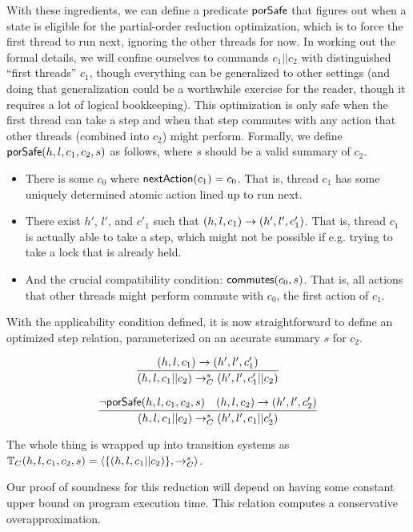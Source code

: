 \documentclass{amsbook}
\theoremstyle{definition}
\theoremstyle{remark}
\numberwithin{section}{chapter}
\numberwithin{equation}{chapter}
\begin{document}
With these ingredients, we can define a predicate $\mathsf{porSafe}$ that figures out when a state is eligible for the partial-order reduction optimization, which is to force the first thread to run next, ignoring the other threads for now.
In working out the formal details, we will confine ourselves to commands $c_1 || c_2$ with distinguished ``first threads'' $c_1$, though everything can be generalized to other settings (and doing that generalization could be a worthwhile exercise for the reader, though it requires a lot of logical bookkeeping).
This optimization is only safe when the first thread can take a step and when that step commutes with any action that other threads (combined into $c_2$) might perform.
Formally, we define $\mathsf{porSafe}(h, l, c_1, c_2, s)$ as follows, where $s$ should be a valid summary of $c_2$.
\begin{itemize}
\item There is some $c_0$ where $\mathsf{nextAction}(c_1) = c_0$.  That is, thread $c_1$ has some uniquely determined atomic action lined up to run next.
\item There exist $h'$, $l'$, and $c'_1$ such that $(h, l, c_1) \to (h', l', c'_1)$.  That is, thread $c_1$ is actually able to take a step, which might not be possible if e.g. trying to take a lock that is already held.
\item And the crucial compatibility condition: $\mathsf{commutes}(c_0, s)$.  That is, all actions that other threads might perform commute with $c_0$, the first action of $c_1$.
\end{itemize}

\newcommand{\smallstepC}[3]{#1 \to_C^{#2} #3}

With the applicability condition defined, it is now straightforward to define an optimized step relation, parameterized on an accurate summary $s$ for $c_2$.

$$\infer{\smallstepC{(h, l, c_1 || c_2)}{s}{(h', l', c'_1 || c_2)}}{
  \smallstep{(h, l, c_1)}{(h', l', c'_1)}
}$$

$$\infer{\smallstepC{(h, l, c_1 || c_2)}{s}{(h', l', c_1 || c'_2)}}{
  \neg \pors{h, l, c_1, c_2, s}
  & \smallstep{(h, l, c_2)}{(h', l', c'_2)}
}$$

The whole thing is wrapped up into transition systems as $\mathbb T_C(h, l, c_1, c_2, s) = {\left \langle \{(h, l, c_1 || c_2)\}, \to_C^s \right \rangle}$.

\newcommand{\tof}[2]{\mt{timeOf}(#1, #2)}

Our proof of soundness for this reduction will depend on having some constant upper bound on program execution time.
This relation computes a conservative overapproximation.
\end{document}
